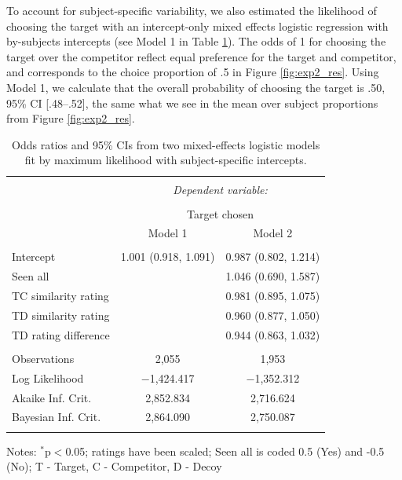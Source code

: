 \documentclass[12pt, a4paper]{article}
\begin{document}
To account for subject-specific variability, we also estimated the likelihood of choosing the target with an intercept-only mixed effects logistic regression with by-subjects intercepts (see Model 1 in Table \ref{latentattr_exp2reg}). The odds of 1 for choosing the target over the competitor reflect equal preference for the target and competitor, and corresponds to the choice proportion of .5 in Figure \ref{fig:exp2_res}. Using Model 1, we calculate that the overall probability of choosing the target is .50, 95\% CI [.48--.52], the same what we see in the mean over subject proportions from Figure \ref{fig:exp2_res}.


\begin{table}[htb!]
\centering
  \begin{threeparttable}
    \caption{Odds ratios and 95\% CIs from two mixed-effects logistic models fit by maximum likelihood with subject-specific intercepts.}
  \label{latentattr_exp2reg}
\begin{tabular}{@{\extracolsep{5pt}}lcc}
\\[-1.8ex]\hline
\hline \\[-1.8ex]
 & \multicolumn{2}{c}{\textit{Dependent variable:}} \\
\cline{2-3}
\\[-1.8ex] & \multicolumn{2}{c}{Target chosen} \\
 & Model 1 & Model 2 \\
\hline \\[-1.8ex]
 Intercept & 1.001 (0.918, 1.091) & 0.987 (0.802, 1.214) \\
  Seen all &  & 1.046 (0.690, 1.587) \\
  TC similarity rating &  & 0.981 (0.895, 1.075) \\
  TD similarity rating &  & 0.960 (0.877, 1.050) \\
  TD rating difference &  & 0.944 (0.863, 1.032) \\
 \hline \\[-1.8ex]
Observations & 2,055 & 1,953 \\
Log Likelihood & $-$1,424.417 & $-$1,352.312 \\
Akaike Inf. Crit. & 2,852.834 & 2,716.624 \\
Bayesian Inf. Crit. & 2,864.090 & 2,750.087 \\
\hline
\hline \\[-1.8ex]
\end{tabular}
    \begin{tablenotes}
      \small
      \item Notes: $^{*}$p$<$0.05; ratings have been scaled; Seen all is coded 0.5 (Yes) and -0.5 (No); T - Target, C - Competitor, D - Decoy
    \end{tablenotes}
  \end{threeparttable}
\end{table}
\end{document}
